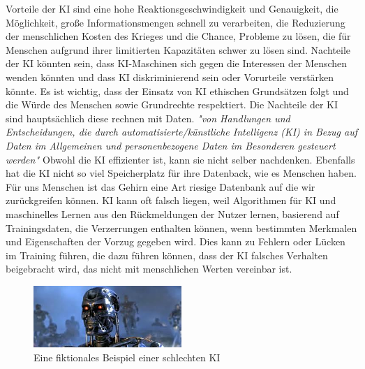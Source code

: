 Vorteile der KI sind eine hohe Reaktionsgeschwindigkeit und Genauigkeit, die Möglichkeit, große Informationsmengen schnell zu verarbeiten, die Reduzierung der menschlichen Kosten des Krieges und die Chance, Probleme zu lösen, die für Menschen aufgrund ihrer limitierten Kapazitäten schwer zu lösen sind. Nachteile der KI könnten sein, dass KI-Maschinen sich gegen die Interessen der Menschen wenden könnten und dass KI diskriminierend sein oder Vorurteile verstärken könnte. Es ist wichtig, dass der Einsatz von KI ethischen Grundsätzen folgt und die Würde des Menschen sowie Grundrechte respektiert.\newline
Die Nachteile der KI sind hauptsächlich diese rechnen mit Daten. \textit{"von Handlungen und Entscheidungen, die durch automatisierte/künstliche Intelligenz (KI) in Bezug auf Daten im Allgemeinen und personenbezogene Daten im Besonderen gesteuert werden" \citep{ethics-cognizant}} Obwohl die KI effizienter ist, kann sie nicht selber nachdenken. Ebenfalls hat die KI nicht so viel Speicherplatz für ihre Datenback, wie es Menschen haben. Für uns Menschen ist das Gehirn eine Art riesige Datenbank auf die wir zurückgreifen können.\newline
KI kann oft falsch liegen, weil Algorithmen für KI und maschinelles Lernen aus den Rückmeldungen der Nutzer lernen, basierend auf Trainingsdaten, die Verzerrungen enthalten können, wenn bestimmten Merkmalen und Eigenschaften der Vorzug gegeben wird. Dies kann zu Fehlern oder Lücken im Training führen, die dazu führen können, dass der KI falsches Verhalten beigebracht wird, das nicht mit menschlichen Werten vereinbar ist.

\begin{figure}[h]
    \centering
    \includegraphics[width=0.5\textwidth]{rogue_ai.jpeg}
    \caption{Eine fiktionales Beispiel einer schlechten KI}
    \label{fig:rogueAI}
\end{figure}
